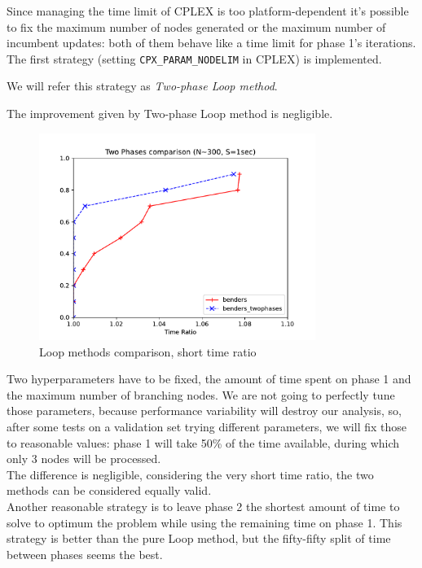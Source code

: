 Since managing the time limit of CPLEX is too platform-dependent it's
possible to fix the maximum number of nodes generated or the maximum number of
incumbent updates: both of them behave like a time limit for phase 1's
iterations. The first strategy (setting \texttt{CPX\_PARAM\_NODELIM} in CPLEX)
is implemented.

We will refer this strategy as \emph{Two-phase Loop method}.

\begin{claim} 
    The improvement given by Two-phase Loop method is negligible.
\end{claim}

\begin{figure}[h]
    \centering
    \includegraphics[width=0.8\textwidth]{figures/benders2phases}
    \caption{Loop methods comparison, short time ratio}
\end{figure}

Two hyperparameters have to be fixed, the amount of time spent on phase 1 and
the maximum number of branching nodes. We are not going to perfectly tune those
parameters, because performance variability will destroy our analysis, so,
after some tests on a validation set trying different parameters, we will fix
those to reasonable values: phase 1 will take 50\% of the time available,
during which only 3 nodes will be processed.\\ The difference is negligible,
considering the very short time ratio, the two methods can be considered
equally valid.\\ Another reasonable strategy is to leave phase 2 the shortest
amount of time to solve to optimum the problem while using the remaining time
on phase 1. This strategy is better than the pure Loop method, but the
fifty-fifty split of time between phases seems the best.

